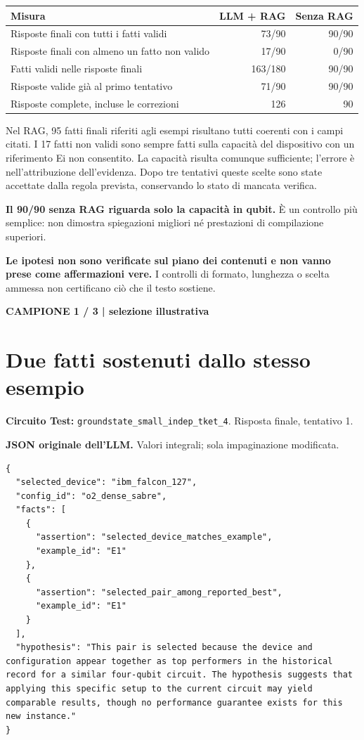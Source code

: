 \documentclass[a4paper,10pt]{article}
\newcommand{\tagline}[1]{{\small\color{ink}\textbf{#1}}\par}
\begin{document}
\begin{tabularx}{\linewidth}{Xrr}\toprule Misura & LLM + RAG & Senza RAG\\\midrule
Risposte finali con tutti i fatti validi & 73/90 & 90/90\\
Risposte finali con almeno un fatto non valido & 17/90 & 0/90\\
Fatti validi nelle risposte finali & 163/180 & 90/90\\
Risposte valide già al primo tentativo & 71/90 & 90/90\\
Risposte complete, incluse le correzioni & 126 & 90\\
\bottomrule\end{tabularx}\par
Nel RAG, 95 fatti finali riferiti agli esempi risultano tutti coerenti con i campi citati. I 17 fatti non validi sono sempre fatti sulla capacità del dispositivo con un riferimento Ei non consentito. La capacità risulta comunque sufficiente; l'errore è nell'attribuzione dell'evidenza. Dopo tre tentativi queste scelte sono state accettate dalla regola prevista, conservando lo stato di mancata verifica.\par
\textbf{Il 90/90 senza RAG riguarda solo la capacità in qubit.} È un controllo più semplice: non dimostra spiegazioni migliori né prestazioni di compilazione superiori.\par
\textbf{Le ipotesi non sono verificate sul piano dei contenuti e non vanno prese come affermazioni vere.} I controlli di formato, lunghezza o scelta ammessa non certificano ciò che il testo sostiene.\par
\newpage
\tagline{CAMPIONE 1 / 3 | selezione illustrativa}
\section*{Due fatti sostenuti dallo stesso esempio}
\textbf{Circuito Test:} \texttt{groundstate\_small\_indep\_tket\_4}. Risposta finale, tentativo 1.\par
\textbf{JSON originale dell'LLM.} Valori integrali; sola impaginazione modificata.\par
\begin{lstlisting}
{
  "selected_device": "ibm_falcon_127",
  "config_id": "o2_dense_sabre",
  "facts": [
    {
      "assertion": "selected_device_matches_example",
      "example_id": "E1"
    },
    {
      "assertion": "selected_pair_among_reported_best",
      "example_id": "E1"
    }
  ],
  "hypothesis": "This pair is selected because the device and configuration appear together as top performers in the historical record for a similar four-qubit circuit. The hypothesis suggests that applying this specific setup to the current circuit may yield comparable results, though no performance guarantee exists for this new instance."
}
\end{lstlisting}
\end{document}
